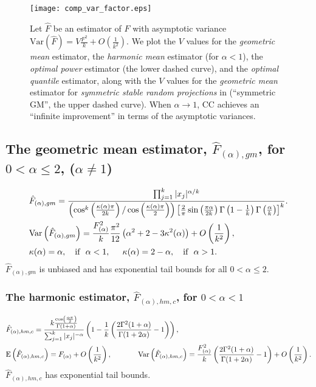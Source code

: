 \documentclass[oneside,10pt]{article}
\begin{document}
\begin{figure}[h]
\begin{center}
\texttt{[image: comp\_var\_factor.eps]}
\end{center}
\vspace{-0.3in}
\caption{Let $\hat{F}$ be an estimator of $F$ with asymptotic variance $\text{Var}\left(\hat{F}\right) = V\frac{F^2}{k} + O\left(\frac{1}{k^2}\right)$. We plot the $V$ values for the {\em geometric mean} estimator,  the {\em harmonic mean} estimator (for $\alpha<1$), the {\em optimal power} estimator (the lower dashed curve), and the {\em optimal quantile} estimator, along with the $V$ values for the {\em geometric mean} estimator for {\em symmetric stable random projections} in \cite{Proc:Li_SODA08} (``symmetric GM'', the upper dashed curve). When $\alpha\rightarrow 1$, CC achieves an ``infinite improvement'' in terms of the asymptotic variances.
}\label{fig_comp_var_factor}
\end{figure}


\subsection{The geometric mean estimator, $\hat{F}_{(\alpha),gm}$, for $0<\alpha\leq 2$,  ($\alpha\neq 1$)}\begin{align}\notag
&\hat{F}_{(\alpha),gm} = \frac{\prod_{j=1}^k |x_j|^{\alpha/k}} { \left(\cos^k\left(\frac{\kappa(\alpha)\pi}{2k}\right)/\cos \left(\frac{\kappa(\alpha)\pi}{2}\right)\right)  \left[\frac{2}{\pi}\sin\left(\frac{\pi\alpha}{2k}\right)
\Gamma\left(1-\frac{1}{k}\right)\Gamma\left(\frac{\alpha}{k}\right)\right]^k}.\\\notag
&\text{Var}\left(\hat{F}_{(\alpha),gm}\right) = \frac{F_{(\alpha)}^2}{k}\frac{\pi^2}{12}\left(\alpha^2+2-3\kappa^2(\alpha)\right)+O\left(\frac{1}{k^2}\right),\\\notag
&\kappa(\alpha) = \alpha, \ \ \ \text{if} \ \  \alpha <1, \hspace{0.2in} \kappa(\alpha) = 2-\alpha, \ \ \ \text{if} \ \  \alpha >1.
\end{align}
$\hat{F}_{(\alpha),gm}$ is unbiased and has exponential tail bounds for all $0<\alpha\leq 2$.

\subsubsection{The harmonic estimator, $\hat{F}_{(\alpha),hm,c}$, for $0<\alpha<1$}\begin{align}\notag
&\hat{F}_{(\alpha),hm,c} = \frac{k\frac{\cos\left(\frac{\alpha\pi}{2}\right)}{\Gamma(1+\alpha)}}{\sum_{j=1}^k|x_j|^{-\alpha}}
\left(1- \frac{1}{k}\left(\frac{2\Gamma^2(1+\alpha)}{\Gamma(1+2\alpha)}-1\right) \right), \\\notag
&\text{E}\left(\hat{F}_{(\alpha),hm,c}\right) = F_{(\alpha)}+O\left(\frac{1}{k^2}\right),\hspace{0.5in}
\text{Var}\left(\hat{F}_{(\alpha),hm,c}\right) = \frac{F^{2}_{(\alpha)}}{k}\left(\frac{2\Gamma^2(1+\alpha)}{\Gamma(1+2\alpha)}-1\right) + O\left(\frac{1}{k^2}\right).
\end{align}
$\hat{F}_{(\alpha),hm,c}$ has exponential tail bounds.
\end{document}
